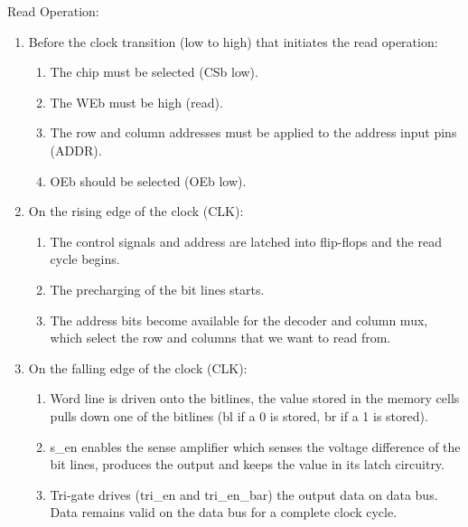 Read Operation:
\begin{enumerate}
\setlength{\itemsep}{0pt}
 \item Before the clock transition (low to high) that initiates the read operation:
  \begin{enumerate}
	\item The chip must be selected (CSb low).
	\item The WEb must be high (read). 
	\item The row and column addresses must be applied to the address input pins (ADDR).
	\item OEb should be selected (OEb low).
   \end{enumerate}
 \item On the rising edge of the clock (CLK):
   \begin{enumerate}
	\item The control signals and address are latched into flip-flops and the read cycle begins. 
	\item The precharging of the bit lines starts.  
	\item The address bits become available for the decoder and column mux, which select the row and columns that we want to read from.
   \end{enumerate}
 \item On the falling edge of the clock (CLK):
   \begin{enumerate}
        \item Word line is driven onto the bitlines, the value stored in the memory cells pulls down one of the bitlines (bl if a 0 is stored, br if a 1 is stored).
	\item s\_en enables the sense amplifier which senses the voltage difference of the bit lines, produces the output and keeps the value in its latch circuitry.
	\item Tri-gate drives (tri\_en and tri\_en\_bar) the output data on data bus. Data remains valid on the data bus for a complete clock cycle.
   \end{enumerate}
\end{enumerate}


